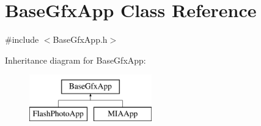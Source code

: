 \hypertarget{classBaseGfxApp}{\section{Base\-Gfx\-App Class Reference}
\label{classBaseGfxApp}
}


{\ttfamily \#include $<$Base\-Gfx\-App.\-h$>$}

Inheritance diagram for Base\-Gfx\-App\-:\begin{figure}[H]
\begin{center}
\leavevmode
\includegraphics[height=2.000000cm]{classBaseGfxApp}
\end{center}
\end{figure}
